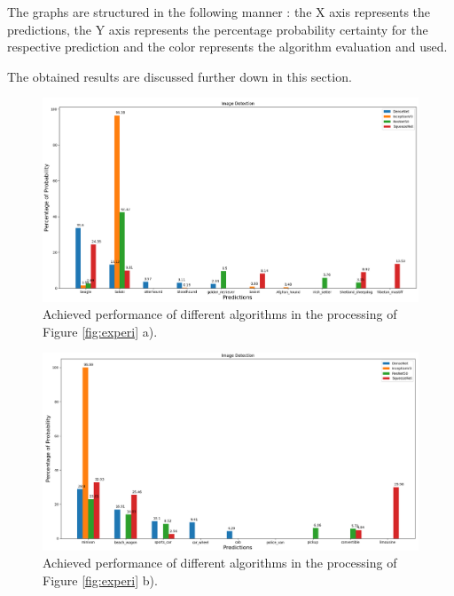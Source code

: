 The graphs are structured in the following manner : the X axis represents the predictions, the Y axis represents the percentage probability certainty for the respective prediction and the color represents the algorithm evaluation and used.

The obtained results are discussed further down in this section.

\begin{figure}[H]
  \centering
  \captionsetup{justification=centering}
  \includegraphics[width=\textwidth]{Sections/4InitialWork/4_images/run1_res.png}
  \caption[Achieved performance of different algorithms]{Achieved performance of different algorithms in the processing of Figure \ref{fig:experi} a).} 
  \label{fig:exp1}
\end{figure}



\begin{figure}[H]
  \centering
  \includegraphics[width=\textwidth]{Sections/4InitialWork/4_images/run3_res.png}
  \caption[Achieved performance of different algorithms]{Achieved performance of different algorithms in the processing of Figure \ref{fig:experi} b).}
  \label{fig:exp2}
\end{figure}




